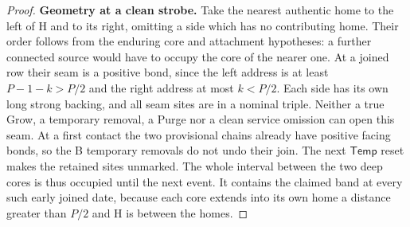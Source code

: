 \begin{proof}
\textbf{Geometry at a clean strobe.} Take the nearest authentic home to the left of H and to its right, omitting a side which has no contributing home. Their order follows from the enduring core and attachment hypotheses: a further connected source would have to occupy the core of the nearer one. At a joined row their seam is a positive bond, since the left address is at least \(P-1-k>P/2\) and the right address at most \(k<P/2\). Each side has its own long strong backing, and all seam sites are in a nominal triple. Neither a true Grow, a temporary removal, a Purge nor a clean service omission can open this seam. At a first contact the two provisional chains already have positive facing bonds, so the B temporary removals do not undo their join. The next \(\mathsf{Temp}\) reset makes the retained sites unmarked. The whole interval between the two deep cores is thus occupied until the next event. It contains the claimed band at every such early joined date, because each core extends into its own home a distance greater than \(P/2\) and H is between the homes.


\end{proof}
